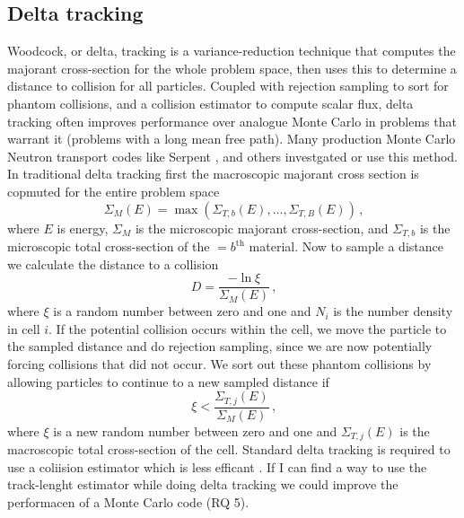 \subsection{Delta tracking}

Woodcock, or delta, tracking \cite{woodcock1965} is a variance-reduction technique that computes the majorant cross-section for the whole problem space, then uses this to determine a distance to collision for all particles.
Coupled with rejection sampling to sort for phantom collisions, and a collision estimator to compute scalar flux, delta tracking often improves performance over analogue Monte Carlo in problems that warrant it (problems with a long mean free path).
Many production Monte Carlo Neutron transport codes like Serpent \cite{Serpent2013, leppanen_use_2017, leppanen_performance_2010}, and others \cite{delta2017rowland} investgated or use this method.
In traditional delta tracking first the macroscopic majorant cross section is copmuted for the entire problem space
\begin{equation}
    \label{eq:majorant}
    \Sigma_{M}(E) = \max\left(\Sigma_{T,b}(E), ..., \Sigma_{T,B}(E)\right) \,\text{,}
\end{equation}
where $E$ is energy, $\Sigma_{M}$ is the microscopic majorant cross-section, and $\Sigma_{T,b}$ is the microscopic total cross-section of the $=b^{\text{th}}$ material.
Now to sample a distance we calculate the distance to a collision
\begin{equation}
    \label{eq:sample}
    D = \frac{-\ln{\xi}}{\Sigma_{M}(E)} \, \text{,} 
\end{equation}
where $\xi$ is a random number between zero and one and $N_i$ is the number density in cell $i$.
If the potential collision occurs within the cell, we move the particle to the sampled distance and do rejection sampling, since we are now potentially forcing collisions that did not occur. We sort out these phantom collisions by allowing particles to continue to a new sampled distance if
\begin{equation}
    \label{eq:reject}
    \xi < \frac{ \Sigma_{T,j}(E) } { \Sigma_M(E) } \, \text{,}
\end{equation}
where $\xi$ is a new random number between zero and one and $\Sigma_{T,j}(E)$ is the macroscopic total cross-section of the cell. 
Standard delta tracking is required to use a coliision estimator which is less efficant \cite{mc2018}.
If I can find a way to use the track-lenght estimator while doing delta tracking we could improve the performacen of a Monte Carlo code (RQ 5).


